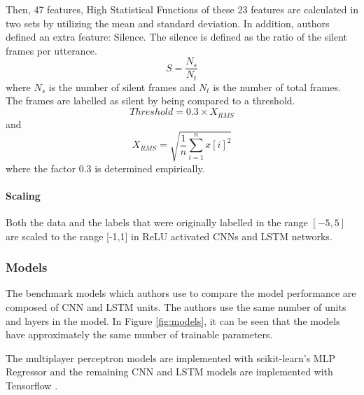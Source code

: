 \documentclass[a4paper,11pt]{article}
\begin{document}
Then, 47 features, High Statistical Functions of these 23 features are calculated in two sets by utilizing the mean and standard deviation. In addition, authors defined an extra feature: Silence. The silence is defined as the ratio of the silent frames per utterance. 
\begin{equation}
    S = \frac{N_s}{N_t}
\end{equation}
where $N_s$ is the number of silent frames and $N_t$ is the number of total frames.
The frames are labelled as silent by being compared to a threshold. 
\begin{equation}
    Threshold = 0.3 \times X_{RMS}
\end{equation} 
and 
\begin{equation}
    X_{RMS} = \sqrt{\frac{1}{n}\sum_{i=1}^n{x[i]}^2}
\end{equation} 
where the factor 0.3 is determined empirically.

\paragraph{Scaling}
Both the data and the labels that were originally labelled in the range $[-5,5]$ are scaled to the range [-1,1] in ReLU activated CNNs and LSTM networks. 

\subsubsection{Models}

The benchmark models which authors use to compare the model performance are composed of CNN and LSTM units. The authors use the same number of units and layers in the model. In Figure \ref{fig:models}, it can be seen that the models have approximately the same number of trainable parameters. 

The multiplayer perceptron models are implemented with scikit-learn's MLP Regressor \cite{scikit-learn} and the remaining CNN and LSTM models are implemented with Tensorflow \cite{tensorflow2015-whitepaper}.
\end{document}
